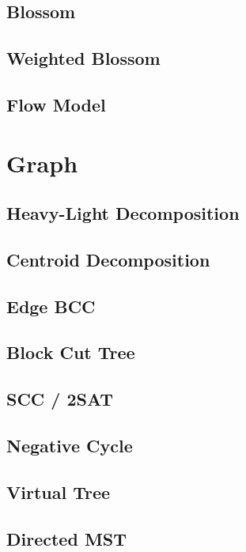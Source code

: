 \subsection{Blossom}

\subsection{Weighted Blossom}

\subsection{Flow Model}


\section{Graph}
\subsection{Heavy-Light Decomposition}

\subsection{Centroid Decomposition}

\subsection{Edge BCC}

\subsection{Block Cut Tree}

\subsection{SCC / 2SAT}

\subsection{Negative Cycle}

\subsection{Virtual Tree}

\subsection{Directed MST}

